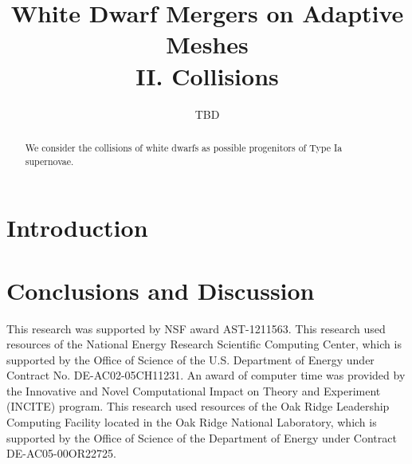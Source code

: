 \documentclass[iop]{../emulateapj}
\begin{document}
\title{White Dwarf Mergers on Adaptive Meshes\\ II. Collisions}


\author{TBD}
\begin{abstract}
We consider the collisions of white dwarfs as possible progenitors of Type Ia 
supernovae.

\end{abstract}

\section{Introduction}

\cite{castro}


\section{Conclusions and Discussion}\label{Sec:Conclusions and Discussion}


\acknowledgments

This research was supported by NSF award AST-1211563.  This research
used resources of the National Energy Research Scientific Computing
Center, which is supported by the Office of Science of the
U.S. Department of Energy under Contract No. DE-AC02-05CH11231.  An
award of computer time was provided by the Innovative and Novel
Computational Impact on Theory and Experiment (INCITE) program.  This
research used resources of the Oak Ridge Leadership Computing Facility
located in the Oak Ridge National Laboratory, which is supported by
the Office of Science of the Department of Energy under Contract
DE-AC05-00OR22725.

\clearpage





\clearpage
\appendix
\end{document}
